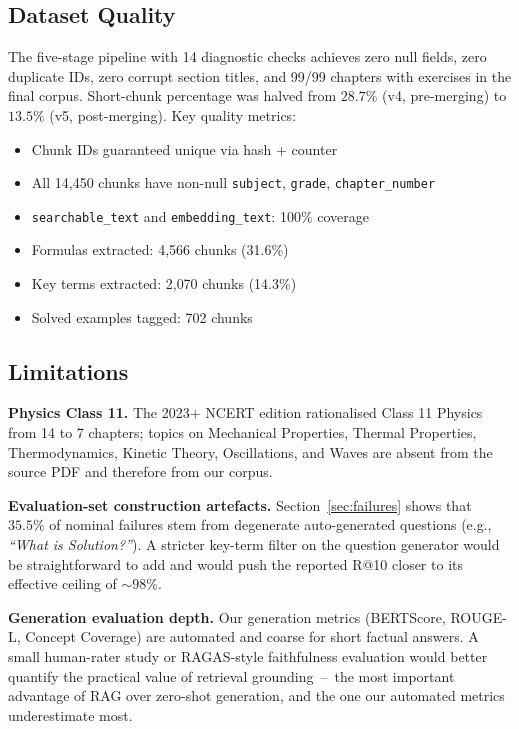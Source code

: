 \documentclass[conference]{IEEEtran}
\begin{document}
\subsection{Dataset Quality}
The five-stage pipeline with 14 diagnostic checks achieves zero null fields, zero duplicate IDs, zero corrupt section titles, and 99/99 chapters with exercises in the final corpus. Short-chunk percentage was halved from $28.7\%$ (v4, pre-merging) to $13.5\%$ (v5, post-merging). Key quality metrics:
\begin{itemize}
    \item Chunk IDs guaranteed unique via hash + counter
    \item All 14{,}450 chunks have non-null \texttt{subject}, \texttt{grade}, \texttt{chapter\_number}
    \item \texttt{searchable\_text} and \texttt{embedding\_text}: 100\% coverage
    \item Formulas extracted: 4{,}566 chunks (31.6\%)
    \item Key terms extracted: 2{,}070 chunks (14.3\%)
    \item Solved examples tagged: 702 chunks
\end{itemize}

\subsection{Limitations}\label{sec:limitations}
\textbf{Physics Class 11.} The 2023+ NCERT edition rationalised Class 11 Physics from 14 to 7 chapters; topics on Mechanical Properties, Thermal Properties, Thermodynamics, Kinetic Theory, Oscillations, and Waves are absent from the source PDF and therefore from our corpus.

\textbf{Evaluation-set construction artefacts.} Section~\ref{sec:failures} shows that $35.5\%$ of nominal failures stem from degenerate auto-generated questions (e.g., \emph{``What is Solution?''}). A stricter key-term filter on the question generator would be straightforward to add and would push the reported R@10 closer to its effective ceiling of ${\sim}98\%$.

\textbf{Generation evaluation depth.} Our generation metrics (BERTScore, ROUGE-L, Concept Coverage) are automated and coarse for short factual answers. A small human-rater study or RAGAS-style faithfulness evaluation would better quantify the practical value of retrieval grounding~--~the most important advantage of RAG over zero-shot generation, and the one our automated metrics underestimate most.
\end{document}

